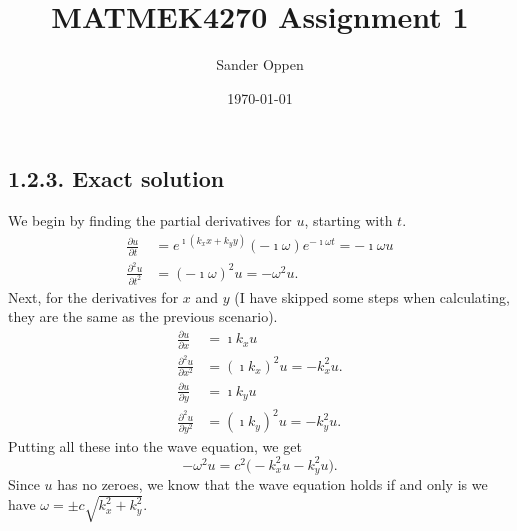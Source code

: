 \documentclass[12pt]{scrartcl}
\begin{document}
\title{MATMEK4270 Assignment 1}
\author{Sander Oppen}
\date{\today}
\maketitle

\subsection*{1.2.3. Exact solution}
We begin by finding the partial derivatives for $u$, starting with $t$.
\begin{align*}
    \frac{\partial u}{\partial t}&= e^{\imath (k_xx+k_yy)}(-\imath \omega)e^{-\imath\omega t}=-\imath\omega u\\
    \frac{\partial^2 u}{\partial t^2} &= (-\imath \omega)^2u = -\omega^2 u. 
\end{align*}
Next, for the derivatives for $x$ and $y$ (I have skipped some steps when calculating, they are the same as the previous scenario).
\begin{align*}
    \frac{\partial u}{\partial x}&= \imath k_x u\\
    \frac{\partial^2 u}{\partial x^2} &= (\imath k_x)^2u = -k_x^2 u. \\
    \frac{\partial u}{\partial y}&= \imath k_y u\\
    \frac{\partial^2 u}{\partial y^2} &= (\imath k_y)^2u = -k_y^2 u. 
\end{align*}
Putting all these into the wave equation, we get
\begin{equation}
    -\omega^2 u = c^2\big( -k_x^2u -k_y^2u\big).
\end{equation}
Since $u$ has no zeroes, we know that the wave equation holds if and only is we have $\omega = \pm c\sqrt{k_x^2+k_y^2}$.

\newpage
\end{document}
